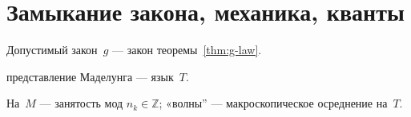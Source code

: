 \section{Замыкание закона, механика, кванты}

\begin{corollary}[Замыкание $g$]
\label{cor:g-closure}
Допустимый закон~$g$ --- закон теоремы~\cref{thm:g-law}.
\end{corollary}

\begin{corollary}
\label{cor:landau}
представление Маделунга --- язык~$T$.
\end{corollary}

\begin{corollary}
\label{cor:full-quantization}
На~$M$ --- занятость мод $n_k\in\mathbb{Z}$; «волны'' --- макроскопическое осреднение на~$T$.
\end{corollary}


